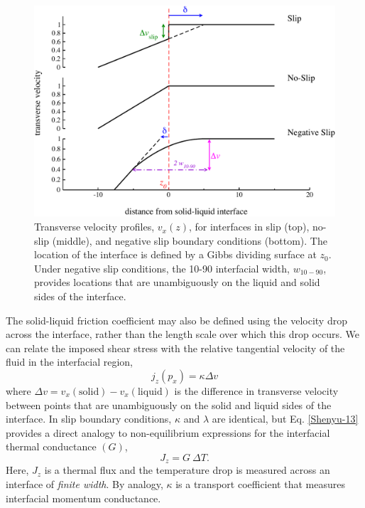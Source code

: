 \begin{figure}
\includegraphics[width=\linewidth]{Figures/slipLengthPlot}
\caption{\label{fig:slipLength} Transverse velocity profiles,
  $v_x(z)$, for interfaces in slip (top), no-slip (middle), and
  negative slip boundary conditions (bottom).  The location of the
  interface is defined by a Gibbs dividing surface at $z_0$. Under
  negative slip conditions, the 10-90 interfacial width, $w_{10-90}$,
  provides locations that are unambiguously on the liquid and solid
  sides of the interface.\label{fig:slipLengthPlot}}
\end{figure}

The solid-liquid friction coefficient may also be defined using the
velocity drop across the interface, rather than the length scale over
which this drop occurs. We can relate the imposed shear stress with
the relative tangential velocity of the fluid in the interfacial
region,\cite{Kuang2012}
\begin{equation}\label{Shenyu-13}
j_{z}(p_{x}) = \kappa \Delta v
\end{equation}
where $\Delta v = v_{x}(\mathrm{solid}) - v_{x}(\mathrm{liquid})$ is
the difference in transverse velocity between points that are
unambiguously on the solid and liquid sides of the interface.  In slip
boundary conditions, $\kappa$ and $\lambda$ are identical, but
Eq. \eqref{Shenyu-13} provides a direct analogy to non-equilibrium
expressions for the interfacial thermal conductance $(G)$,
\begin{equation}
J_z = G~ \Delta T.
\end{equation}
Here, $J_z$ is a thermal flux and the temperature drop is measured
across an interface of \textit{finite width}. By analogy, $\kappa$ is
a transport coefficient that measures interfacial momentum
conductance.

